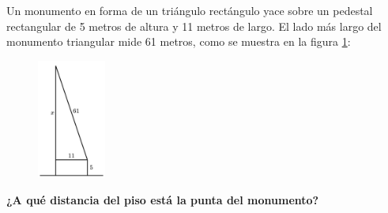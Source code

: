\question[15]  Un monumento en forma de un triángulo rectángulo yace sobre un pedestal rectangular de 5 metros de altura y 11 metros de largo.
El lado más largo del monumento triangular mide 61 metros, como se muestra en la figura \ref{fig:des_pitagoras_06}:

\begin{figure}[H]
    \begin{center}
        \includegraphics[width=0.2\textwidth]{../images/des_pitagoras_06.png}
    \end{center}
    \caption{}
    \label{fig:des_pitagoras_06}
\end{figure}

\textbf{¿A qué distancia del piso está la punta del monumento?}
